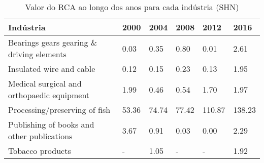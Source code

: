 \begin{table}
\centering
\caption{Valor do RCA ao longo dos anos para cada indústria (SHN)}
\begin{tabular}{p{6cm}p{1.5cm}p{1.5cm}p{1.5cm}p{1.5cm}p{1.5cm}}
\toprule
                                 Indústria &  2000 &  2004 &  2008 &   2012 &   2016 \\
\midrule
 Bearings gears gearing \& driving elements &  0.03 &  0.35 &  0.80 &   0.01 &   2.61 \\
                  Insulated wire and cable &  0.12 &  0.15 &  0.23 &   0.13 &   1.95 \\
Medical surgical and orthopaedic equipment &  1.99 &  0.46 &  0.54 &   1.70 &   1.97 \\
             Processing/preserving of fish & 53.36 & 74.74 & 77.42 & 110.87 & 138.23 \\
Publishing of books and other publications &  3.67 &  0.91 &  0.03 &   0.00 &   2.29 \\
                          Tobacco products &     - &  1.05 &     - &      - &   1.92 \\
\bottomrule
\end{tabular}
\end{table}
